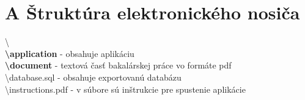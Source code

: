\documentclass[12pt, oneside]{book}
\begin{document}
\newpage
\addtocounter{section}{1}
\section*{A Štruktúra elektronického nosiča}
\textbackslash \\
\textbf{\textbackslash application} - obsahuje aplikáciu\\
\textbf{\textbackslash document} - textová časť bakalárskej práce vo formáte pdf \\
\textbackslash database.sql - obsahuje exportovanú databázu \\
\textbackslash instructions.pdf - v súbore sú inštrukcie pre spustenie aplikácie \\
\end{document}
